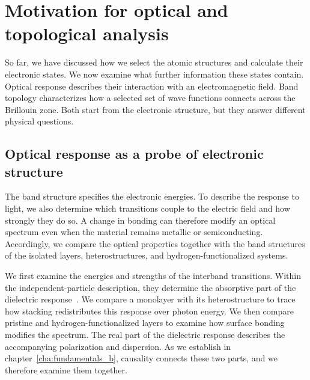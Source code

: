 \section{Motivation for optical and topological analysis}
\label{sec:intro_observables}

So far, we have discussed how we select the atomic structures and calculate their electronic states.
We now examine what further information these states contain.
Optical response describes their interaction with an electromagnetic field.
Band topology characterizes how a selected set of wave functions connects across the Brillouin zone.
Both start from the electronic structure, but they answer different physical questions.

\subsection{Optical response as a probe of electronic structure}
\label{subsec:opt_observables_motivation}

The band structure specifies the electronic energies.
To describe the response to light, we also determine which transitions couple to the electric field and how strongly they do so.
A change in bonding can therefore modify an optical spectrum even when the material remains metallic or semiconducting.
Accordingly, we compare the optical properties together with the band structures of the isolated layers, heterostructures, and hydrogen-functionalized systems.

We first examine the energies and strengths of the interband transitions.
Within the independent-particle description, they determine the absorptive part of the dielectric response~\cite{onida2002electronic}.
We compare a monolayer with its heterostructure to trace how stacking redistributes this response over photon energy.
We then compare pristine and hydrogen-functionalized layers to examine how surface bonding modifies the spectrum.
The real part of the dielectric response describes the accompanying polarization and dispersion.
As we establish in chapter~\ref{cha:fundamentals_b}, causality connects these two parts, and we therefore examine them together.

